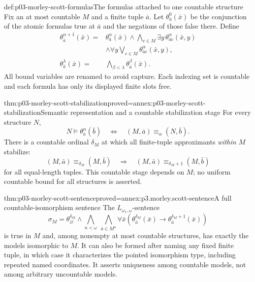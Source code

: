 \begin{hbdefinition}{def:p03-morley-scott-formulas}{The formulas attached to one countable structure}
Fix an at most countable \(M\) and a finite tuple \(\bar a\).
Let \(\theta_{\bar a}^{0}(\bar x)\) be the conjunction
of the atomic formulas true at \(\bar a\) and the
negations of those false there. Define
\[
\begin{split}
 \theta_{\bar a}^{\alpha+1}(\bar x)
   ={}&\theta_{\bar a}^{\alpha}(\bar x)
       \land\bigwedge_{c\in M}\exists y\,
                         \theta_{\bar a c}^{\alpha}(\bar x,y)\\
      &\land\forall y\bigvee_{c\in M}
                         \theta_{\bar a c}^{\alpha}(\bar x,y),\\
 \theta_{\bar a}^{\lambda}(\bar x)
   ={}&\bigwedge_{\beta<\lambda}
                         \theta_{\bar a}^{\beta}(\bar x).
\end{split}
\]
All bound variables are renamed to avoid capture.
Each indexing set is countable and each formula has
only its displayed finite slots free.
\end{hbdefinition}

\begin{hblemma}{thm:p03-morley-scott-stabilization}{proved=annex:p03-morley-scott-stabilization}{Semantic representation and a countable stabilization stage}
For every structure \(N\),
\[
 N\models\theta_{\bar a}^{\alpha}(\bar b)
       \quad\Longleftrightarrow\quad
 (M,\bar a)\equiv_\alpha(N,\bar b).
\]
There is a countable ordinal \(\delta_M\) at which
all finite-tuple approximants \emph{within \(M\)}
stabilize:
\[
 (M,\bar a)\equiv_{\delta_M}(M,\bar b)
       \quad\Longrightarrow\quad
 (M,\bar a)\equiv_{\delta_M+1}(M,\bar b)
\]
for all equal-length tuples.
This countable stage depends on \(M\); no uniform
countable bound for all structures is asserted.
\end{hblemma}

\begin{hbtheorem}{thm:p03-morley-scott-sentence}{proved=annex:p3.morley.scott-sentence}{A full countable-isomorphism sentence}
The \(L_{\omega_1,\omega}\)-sentence
\[
 \sigma_M=
 \theta_\varnothing^{\delta_M}
 \land\bigwedge_{n<\omega}\ \bigwedge_{\bar a\in M^n}
   \forall\bar x\left(
       \theta_{\bar a}^{\delta_M}(\bar x)\to
       \theta_{\bar a}^{\delta_M+1}(\bar x)\right)
\]
is true in \(M\) and, among nonempty at most countable
structures, has exactly the models isomorphic to \(M\).
It can also be formed after naming any fixed finite
tuple, in which case it characterizes the pointed
isomorphism type, including repeated named coordinates.
It asserts uniqueness among countable models, not
among arbitrary uncountable models.
\end{hbtheorem}

